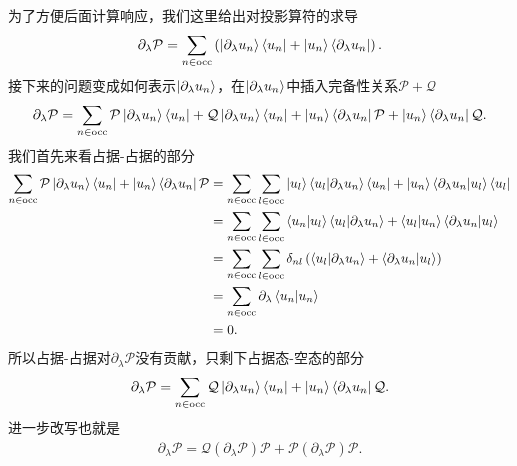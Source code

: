 \documentclass[10pt, oneside]{article}
\begin{document}
\vspace{2em}
为了方便后面计算响应，我们这里给出对投影算符的求导
\begin{align}
	\partial_{\lambda} \mathcal{P}  = \sum_{n \in \mathrm{occ }} \left(\ket{\partial_{\lambda} u_{n }} \bra{u_{n }} + \ket{u_{n }} \bra{\partial_{\lambda} u_{n }}\right).
\end{align}
接下来的问题变成如何表示\(\ket{\partial_{\lambda} u_{n }} \)，在\(\ket{\partial_{\lambda} u_{n }}\)中插入完备性关系\(\mathcal{P} + \mathcal{Q}\) 
\begin{align}
	\partial_{\lambda} \mathcal{P} = \sum_{n \in \mathrm{occ}} \mathcal{P} \ket{\partial_{\lambda} u_{n }} \bra{u_{n }} + \mathcal{Q} \ket{\partial_{\lambda} u_{n }} \bra{u_{n }} + \ket{u_{n }} \bra{\partial_{\lambda} u_{n }} \mathcal{P} + \ket{u_{n }} \bra{\partial_{\lambda} u_{n }} \mathcal{Q}.
\end{align}
我们首先来看占据-占据的部分
\begin{align}
	\begin{split}
		\sum_{n \in \mathrm{occ}} \mathcal{P} \ket{\partial_{\lambda} u_{n }} \bra{u_{n }} + \ket{u_{n }} \bra{\partial_{\lambda} u_{n }} \mathcal{P} & = \sum_{n \in \mathrm{occ}} \sum_{l \in \mathrm{occ}} \ket{u_{l }} \braket{u_{l } | \partial_{\lambda} u_{n }} \bra{u_{n }} + \ket{u_{n }} \braket{\partial_{\lambda} u_{n } | u_{l }} \bra{u_{l }} \\
		& = \sum_{n \in \mathrm{occ}} \sum_{l \in \mathrm{occ}} \braket{u_{n } | u_{l }} \braket{u_l | \partial_{\lambda} u_{n }} + \braket{u_{l } | u_{n }} \braket{\partial_{\lambda} u_{n } | u_{l }} \\
		& = \sum_{n \in \mathrm{occ}} \sum_{l \in \mathrm{occ}} \delta_{n l } \left(\braket{u_l | \partial_{\lambda} u_{n }} + \braket{\partial_{\lambda} u_{n } | u_{l }}\right) \\
		& = \sum_{n \in \mathrm{occ}} \partial_{\lambda} \braket{u_{n } | u_{n }} \\
		& = 0.
	\end{split}
\end{align}
所以占据-占据对\(\partial_{\lambda} \mathcal{P}\)没有贡献，只剩下占据态-空态的部分
\begin{align}
	\partial_{\lambda} \mathcal{P} = \sum_{n \in \mathrm{occ}} \mathcal{Q} \ket{\partial_{\lambda} u_{n }} \bra{u_{n }}  + \ket{u_{n }} \bra{\partial_{\lambda} u_{n }} \mathcal{Q}.
\end{align}
进一步改写也就是
\begin{align}
	\boxed{
		\partial_{\lambda} \mathcal{P} = \mathcal{Q} \left(\partial_{\lambda} \mathcal{P}\right) \mathcal{P} + \mathcal{P} \left(\partial_{\lambda} \mathcal{P}\right) \mathcal{P}.	
	}
\end{align}
\end{document}
